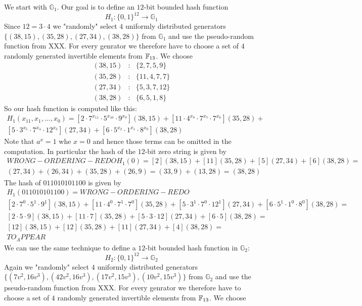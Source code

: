 We start with $\mathbb{G}_1$. Our goal is to define an $12$-bit bounded hash function
$$
H_{1}: \{0,1\}^{12} \to \mathbb{G}_1
$$
Since $12= 3\cdot 4$ we "randomly" select $4$ uniformly distributed generators $\{(38, 15), (35,28), (27, 34), (38, 28)\}$ from $\mathbb{G}_1$ and use the pseudo-random function from XXX.
For every genrator we therefore have to choose a set of $4$ randomly generated invertible elements from $\mathbb{F}_{13}$. We choose
$$
\begin{array}{lcl}
(38,15) &:& \{2,7,5,9\}\\
(35,28) &:& \{11,4,7,7\}\\
(27,34) &:& \{5,3,7,12\}\\
(38,28) &:& \{6,5,1,8\}
\end{array}
$$
So our hash function is computed like this:
\begin{multline*}
H_1(x_{11},x_1,\ldots, x_{0})=
[2\cdot 7^{x_{11}}\cdot 5^{x_{10}}\cdot 9^{x_9}](38,15)+
[11\cdot 4^{x_8}\cdot 7^{x_7}\cdot 7^{x_6}](35,28)+\\
[5\cdot 3^{x_5}\cdot 7^{x_4}\cdot 12^{x_3}](27,34) +
[6\cdot 5^{x_2}\cdot 1^{x_{1}}\cdot 8^{x_{0}}](38,28)
\end{multline*}
Note that $a^x=1$ whe $x=0$ and hence those terms can be omitted in the computation.
In particular the hash of the $12$-bit zero string is given by
\begin{multline*}WRONG-ORDERING-REDO
H_1(0)= [2](38,15)+[11](35,28)+[5](27,34)+[6](38,28)= \\
(27,34)+(26,34)+(35,28)+(26,9)= (33,9) + (13,28) = (38,28)
\end{multline*}
The hash of $011010101100$ is given by
\begin{multline*}
H_1(011010101100)=WRONG-ORDERING-REDO\\
[2\cdot 7^{0}\cdot 5^{1}\cdot 9^{1}](38,15)+
[11\cdot 4^{0}\cdot 7^{1}\cdot 7^{0}](35,28)+
[5\cdot 3^{1}\cdot 7^{0}\cdot 12^{1}](27,34) +
[6\cdot 5^{1}\cdot 1^{0}\cdot 8^{0}](38,28)=\\
[2\cdot 5\cdot 9](38,15)+
[11\cdot 7](35,28)+
[5\cdot 3\cdot 12](27,34) +
[6\cdot 5](38,28)=\\
[12](38,15)+
[12](35,28)+
[11](27,34) +
[4](38,28)=\\
TO_APPEAR
\end{multline*}
We can use the same technique to define a $12$-bit bounded hash function in $\mathbb{G}_2$:
$$
H_{2}: \{0,1\}^{12} \to \mathbb{G}_2
$$
Again we "randomly" select $4$ uniformly distributed generators $\{(7v^2 , 16v^3 ), (42v^2 , 16v^3 ), (17v^2 , 15v^3 ), (10v^2 , 15v^3 )\}$ from $\mathbb{G}_2$ and use the pseudo-random function from XXX. For every genrator we therefore have to choose a set of $4$ randomly generated invertible elements from $\mathbb{F}_{13}$. We choose
